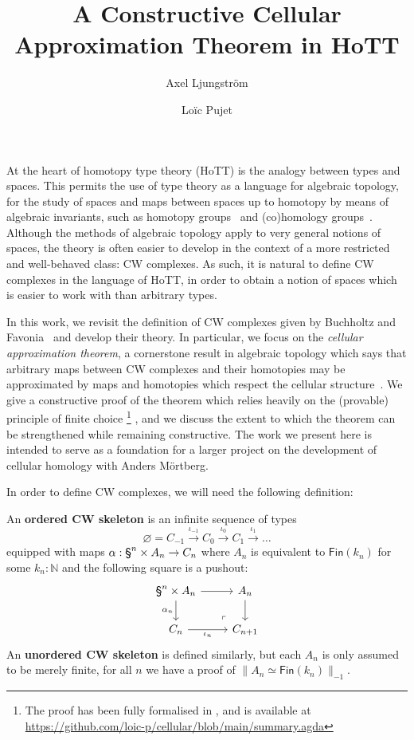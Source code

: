 \documentclass{easychair}
\title{A Constructive Cellular Approximation Theorem in HoTT}
\author{
Axel Ljungström \and Loïc Pujet}
\institute{
  {
  Stockholm University,
  Stockholm, Sweden
  }
 }
\begin{document}
\maketitle

At the heart of homotopy type theory (HoTT) is the analogy between types and spaces.
%
This permits the use of type theory as a language for algebraic topology, \ie for the study
of spaces and maps between spaces up to homotopy by means of algebraic invariants, such as homotopy groups~\cite{HoTT13,Brunerie16,Buchholtz2016TheCC} and (co)homology groups~\cite{LicataFinster14,CavalloMsc15,BuchholtzFavonia18,FlorisPhd,graham18,BLM22,christensen2020hurewicz,LLM23,LM24}.
%
Although the methods of algebraic topology apply to very general notions of spaces, the theory is
often easier to develop in the context of a more restricted and well-behaved class:
CW complexes.
%
As such, it is natural to define CW complexes in the language of HoTT,
in order to obtain a notion of spaces which is easier to work with than arbitrary types.

In this work, we revisit the definition of CW complexes given by Buchholtz and
Favonia~\cite{BuchholtzFavonia18} and develop their theory.
%
In particular, we focus on the \emph{cellular approximation theorem}, a cornerstone result in
algebraic topology which says that arbitrary maps between CW complexes and their homotopies may be
approximated by maps and homotopies which respect the cellular structure~\cite[chap. 10]{May1999}.
%
We give a constructive proof of the theorem which relies heavily on the (provable) principle of
finite choice%
\footnote{The proof has been fully formalised in \CubicalAgda, and is available at \url{https://github.com/loic-p/cellular/blob/main/summary.agda}}%
, and we discuss the extent to which the theorem can be strengthened while remaining constructive.
%
The work we present here is intended to serve as a foundation for a larger
project on the development of cellular homology with Anders Mörtberg.

In order to define CW complexes, we will need the following definition:

\begin{definition}[CW skeleta]
  An \textbf{ordered CW skeleton} is an infinite sequence of types $$\varnothing = C_{-1} \xrightarrow{\iota_{-1}} C_0 \xrightarrow{\iota_{0}} C_1 \xrightarrow{\iota_{1}} \dots$$
  equipped with maps $\alpha : \sphere{n} \times A_n \to C_n$ where $A_n$ is equivalent to $\mathsf{Fin}(k_n)$ for some $k_n : \mathbb{N}$ and the following square is a pushout:
  \[
\begin{tikzcd}[ampersand replacement=\&]
	{\sphere{n} \times A_n} \& {A_n} \\
	{C_n} \& {C_{n+1}}
	\arrow[from=1-1, to=1-2]
	\arrow["{\alpha_n}"', from=1-1, to=2-1]
	\arrow["{\iota_n}"', from=2-1, to=2-2]
	\arrow[from=1-2, to=2-2]
	\arrow["\lrcorner"{anchor=center, pos=0.125, rotate=180}, draw=none, from=2-2, to=1-1]
\end{tikzcd}
\]
An \textbf{unordered CW skeleton} is defined similarly, but each $A_n$ is only assumed to be merely
finite, \ie for all \( n \) we have a proof of \( \| A_n \simeq \mathsf{Fin}(k_n) \|_{-1} \).
\end{definition}
\end{document}
